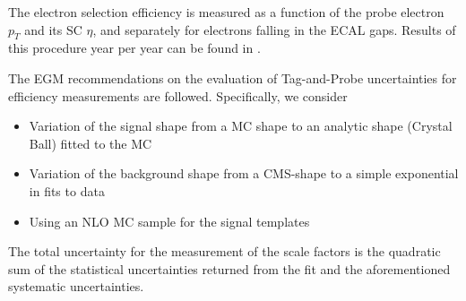 The electron selection efficiency is measured as a function of the probe electron $p_{T}$ and its SC $\eta$, and separately for electrons falling in the ECAL gaps.  Results of this procedure year per year can be found in
.




 The EGM recommendations on the evaluation of Tag-and-Probe uncertainties for efficiency measurements are followed. Specifically, we consider

\begin{itemize}
   \item Variation of the signal shape from a MC shape to an analytic shape (Crystal Ball) fitted to the MC
   \item Variation of the background shape from a CMS-shape to a simple exponential in fits to data
   \item Using an NLO MC sample for the signal templates
\end{itemize}

The total uncertainty for the measurement of the scale factors is the quadratic sum of the statistical uncertainties returned from the fit and the aforementioned systematic uncertainties.

